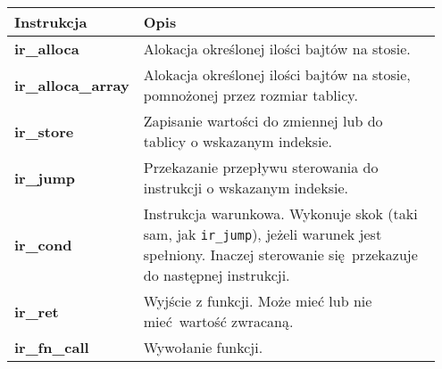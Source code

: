 	\begin{center}
		\setlength{\tabcolsep}{0.5em}
		\renewcommand{\arraystretch}{1.5}
		\begin{tabular}{| L{0.2\linewidth} | L{0.75\linewidth} | }
			\hline
			\textbf{Instrukcja} & \textbf{Opis} \\
			\hline
			\textcolor{instrc}{\textbf{ir\_alloca}}
				& Alokacja określonej ilości bajtów
                 na stosie. \\
			\hline
			\textcolor{instrc}{\textbf{ir\_alloca\_array}}
            	& Alokacja określonej ilości bajtów
				  na stosie, pomnożonej przez rozmiar
                  tablicy. \\
			\hline
			\textcolor{instrc}{\textbf{ir\_store}} 
				& Zapisanie wartości do zmiennej
                  lub do tablicy o wskazanym
                  indeksie. \\
			\hline

			\textcolor{instrc}{\textbf{ir\_jump}}
				& Przekazanie przepływu sterowania
                  do instrukcji o wskazanym indeksie. \\
			\hline
			\textcolor{instrc}{\textbf{ir\_cond}}
				& Instrukcja warunkowa. Wykonuje skok
         	     (taki sam, jak \texttt{ir\_jump}),
                  jeżeli warunek jest spełniony.
                  Inaczej sterowanie się przekazuje
                  do następnej instrukcji. \\
			\hline
			\textcolor{instrc}{\textbf{ir\_ret}}
				& Wyjście z funkcji. Może mieć lub nie
                  mieć wartość zwracaną. \\
  			\hline
  			\textcolor{instrc}{\textbf{ir\_fn\_call}}
                & Wywołanie funkcji. \\
            \hline
		\end{tabular}
	\end{center}
	
	\spacing

